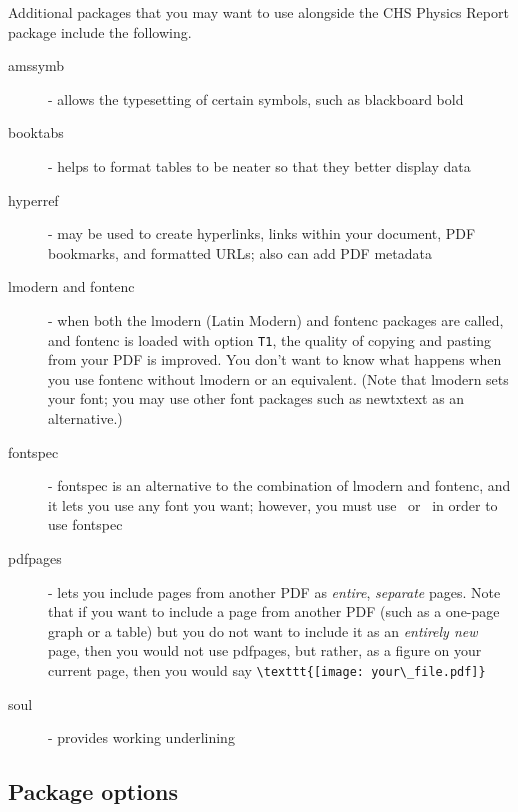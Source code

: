 \documentclass[12pt]{ltxdoc}
\makeatletter
\def\LaTeX{ L\kern -.21em{\sbox \z@ T\vbox to\ht \z@ {\hbox {\check@mathfonts \fontsize \sf@size \z@ \math@fontsfalse \selectfont A}\vss }}\kern -.1em\TeX}%
\makeatother
\begin{document}
Additional packages that you may want to use alongside the CHS Physics Report package include the following.\vspace{-.5\parskip} \renewcommand{\descriptionlabel}[1]{\hspace{\labelsep}\bfseries\sffamily{#1}}
\begin{description}
\item[amssymb] -\; allows the typesetting of certain symbols, such as blackboard bold
\item[booktabs] -\; helps to format tables to be neater so that they better display data
\item[hyperref] -\; may be used to create hyperlinks, links within your document, PDF bookmarks, and formatted URLs; also can add PDF metadata
\item[lmodern and fontenc] -\; when both the lmodern (Latin Modern) and fontenc packages are called, and fontenc is loaded with option \verb|T1|, the quality of copying and pasting from your PDF is improved. You don't want to know what happens when you use fontenc without lmodern or an equivalent. (Note that lmodern sets your font; you may use other font packages such as newtxtext as an alternative.)
\item[fontspec] -\; fontspec is an alternative to the combination of  lmodern and fontenc, and it lets you use any font you want; however, you must use \begingroup\let\nLaTeX\LaTeX\def\LaTeX{\!\makebox{\nLaTeX}}\XeLaTeX\endgroup\ or \makebox{Lua\hspace{-.22em}\LaTeX}\ in order to use fontspec
\item[pdfpages] -\; lets you include pages from another PDF as  \emph{entire}, \emph{separate} pages. Note that if you want to include a page from another PDF (such as a one-page graph or a table) but you do not want to include it as an \emph{entirely new} page, then you would not use pdfpages, but rather, as a figure on your current page, then you would say \verb|\texttt{[image: your\_file.pdf]}|
\item[soul] -\; provides working underlining
\end{description}

\subsection{Package options}
\end{document}
